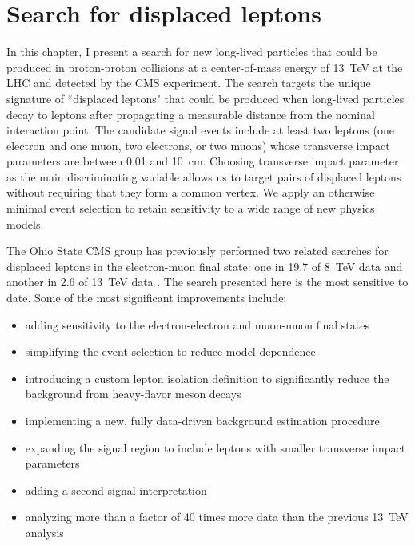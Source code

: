 \chapter{Search for displaced leptons}
\label{displaced_leptons}
In this chapter, I present a search for new long-lived particles that could be produced in proton-proton collisions at a center-of-mass energy of \SI{13}{\TeV} at the LHC and detected by the CMS experiment. The search targets the unique signature of ``displaced leptons" that could be produced when long-lived particles decay to leptons after propagating a measurable distance from the nominal interaction point. The candidate signal events include at least two leptons (one electron and one muon, two electrons, or two muons) whose transverse impact parameters are between \num{0.01} and \SI{10}{\cm}. Choosing transverse impact parameter as the main discriminating variable allows us to target pairs of displaced leptons without requiring that they form a common vertex. We apply an otherwise minimal event selection to retain sensitivity to a wide range of new physics models.

The Ohio State CMS group has previously performed two related searches for displaced leptons in the electron-muon final state: one in \SI{19.7}{\fb} of \SI{8}{\TeV} data and another in \SI{2.6}{\fb} of \SI{13}{\TeV} data \cite{displaced_leptons_run1, displaced_leptons_bing}. The search presented here is the most sensitive to date. Some of the most significant improvements include:
\begin{itemize}
    \itemsep0em
    \item adding sensitivity to the electron-electron and muon-muon final states
    \item simplifying the event selection to reduce model dependence
    \item introducing a custom lepton isolation definition to significantly reduce the background from heavy-flavor meson decays
    \item implementing a new, fully data-driven background estimation procedure
    \item expanding the signal region to include leptons with smaller transverse impact parameters
    \item adding a second signal interpretation
    \item analyzing more than a factor of \num{40} times more data than the previous \SI{13}{\TeV} analysis \cite{displaced_leptons_bing}
\end{itemize}

